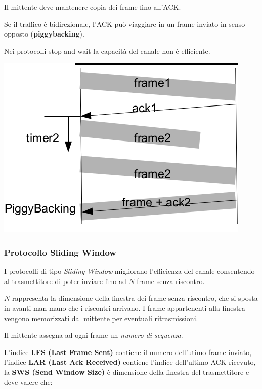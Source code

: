             Il mittente deve mantenere copia dei frame fino all'ACK.

            Se il traffico è bidirezionale, l'ACK può viaggiare in un frame inviato in senso opposto (\textbf{piggybacking}).

            Nei protocolli stop-and-wait la capacità del canale non è efficiente.

            \begin{center}
                \includegraphics[scale=0.45]{chapters/3/assets/schema_i.png}
            \end{center}

        \subsubsection{Protocollo Sliding Window}
            I protocolli di tipo \textit{Sliding Window} migliorano l'efficienza del canale consentendo al trasmettitore di poter inviare fino ad $N$ frame senza riscontro.
        
            $N$ rappresenta la dimensione della finestra dei frame senza riscontro, che si sposta in avanti man mano che i riscontri arrivano. I frame appartenenti alla finestra vengono memorizzati dal mittente per eventuali ritrasmissioni.

            Il mittente assegna ad ogni frame un \textit{numero di sequenza}.

            L'indice \textbf{LFS (Last Frame Sent)} contiene il numero dell'utimo frame inviato, l'indice \textbf{LAR (Last Ack Received)} contiene l'indice dell'ultimo ACK ricevuto, la \textbf{SWS (Send Window Size)} è dimensione della finestra del trasmettitore e deve valere che:

